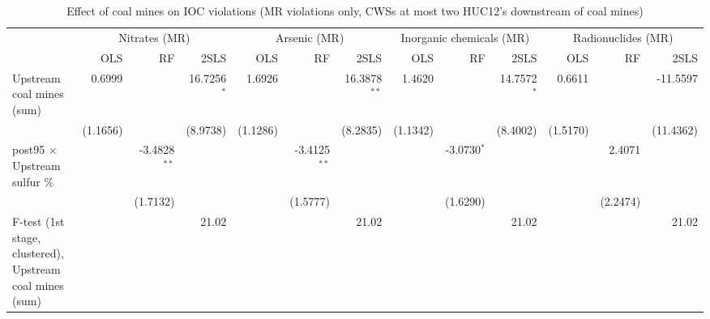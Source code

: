 
\begin{table}[htbp]
   
   \caption{\label{2sls_dwnstrm2step_minevio_mr_ivsum} Effect of coal mines on IOC violations (MR violations only, CWSs at most two HUC12's downstream of coal mines)}
   \bigskip
   
   \centering
   
   \begin{adjustbox}{width = \textwidth, center}
      
      
      \begin{tabular}{lrrrrrrrrrrrr}
         \toprule
         
          & \multicolumn{3}{c}{Nitrates (MR)} & \multicolumn{3}{c}{Arsenic (MR)} & \multicolumn{3}{c}{Inorganic chemicals (MR)} & \multicolumn{3}{c}{Radionuclides (MR)}\\
         
                                                                  & OLS      & RF             & 2SLS          & OLS      & RF             & 2SLS           & OLS      & RF            & 2SLS          & OLS      & RF       & 2SLS\\  
         
         \midrule 
         Upstream coal mines (sum)                                & 0.6999   &                & 16.7256$^{*}$ & 1.6926   &                & 16.3878$^{**}$ & 1.4620   &               & 14.7572$^{*}$ & 0.6611   &          & -11.5597\\   
                                                                  & (1.1656) &                & (8.9738)      & (1.1286) &                & (8.2835)       & (1.1342) &               & (8.4002)      & (1.5170) &          & (11.4362)\\   
         post95 $\times$ Upstream sulfur \%                       &          & -3.4828$^{**}$ &               &          & -3.4125$^{**}$ &                &          & -3.0730$^{*}$ &               &          & 2.4071   &   \\   
                                                                  &          & (1.7132)       &               &          & (1.5777)       &                &          & (1.6290)      &               &          & (2.2474) &   \\   
         
         F-test (1st stage, clustered), Upstream coal mines (sum) &          &                & 21.02         &          &                & 21.02          &          &               & 21.02         &          &          & 21.02\\  
         

\end{tabular}
\end{adjustbox}
\end{table}

